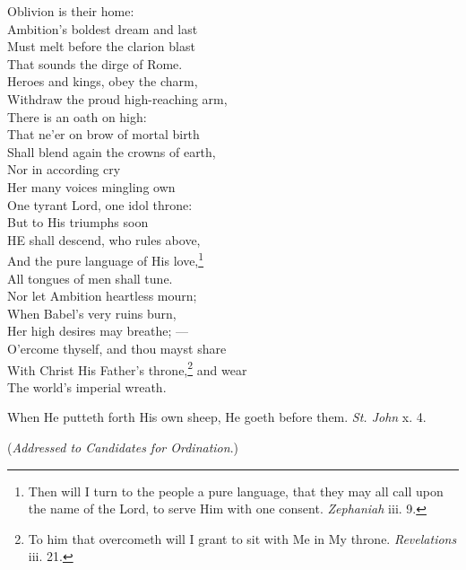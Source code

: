  Oblivion is their home: \\
 Ambition’s boldest dream and last \\
 Must melt before the clarion blast \\
 That sounds the dirge of Rome. \\
  Heroes and kings, obey the charm, \\
 Withdraw the proud high-reaching arm, \\
 There is an oath on high: \\
 That ne’er on brow of mortal birth \\
 Shall blend again the crowns of earth, \\
 Nor in according cry \\
  Her many voices mingling own \\
 One tyrant Lord, one idol throne: \\
 But to His triumphs soon \\
 HE shall descend, who rules above, \\
 And the pure language of His love,\footnote{Then will I turn to the people a pure language, that they may all call upon the name of the Lord, to serve Him with one consent. \emph{Zephaniah} iii. 9.} \\
 All tongues of men shall tune. \\
  Nor let Ambition heartless mourn; \\
 When Babel’s very ruins burn, \\
 Her high desires may breathe; — \\
 O’ercome thyself, and thou mayst share \\
 With Christ His Father’s throne,\footnote{To him that overcometh will I grant to sit with Me in My throne. \emph{Revelations} iii. 21.} and wear \\
 The world’s imperial wreath.\\


When He putteth forth His own sheep, He goeth before them. \emph{St. John} x. 4.

(\emph{Addressed to Candidates for Ordination}.)

